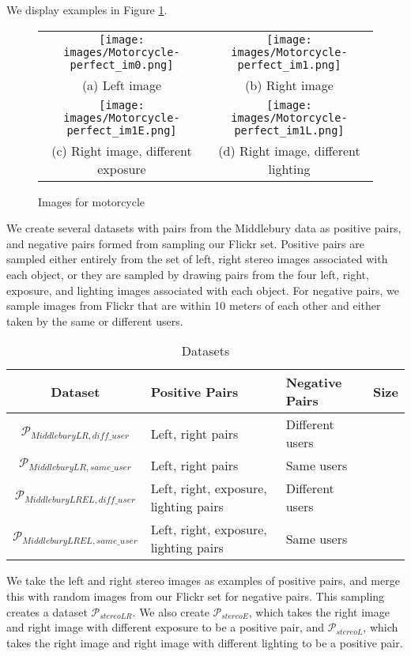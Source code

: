 We display examples in Figure \ref{fig:middlebury}.

\begin{figure}[!htbp]
	\centering
	\begin{tabular}{cc}
		\texttt{[image: images/Motorcycle-perfect\_im0.png]}  &       \texttt{[image: images/Motorcycle-perfect\_im1.png]}  \\
		(a) Left image & (b) Right image\\[6pt]
		\texttt{[image: images/Motorcycle-perfect\_im1E.png]}  &       \texttt{[image: images/Motorcycle-perfect\_im1L.png]} \\
		(c) Right image, different exposure & (d) Right image, different lighting\\[6pt]
	\end{tabular}
	\label{fig:middlebury}
	\caption{Images for motorcycle}
\end{figure}

We create several datasets with pairs from the Middlebury data as positive pairs, and negative pairs formed from sampling our Flickr set. Positive pairs are sampled either entirely from the set of left, right stereo images associated with each object, or they are sampled by drawing pairs from the four left, right, exposure, and lighting images associated with each object. For negative pairs, we sample images from Flickr that are within 10 meters of each other and either taken by the same or different users.

\begin{table}
	\centering
	\begin{tabular}{c >{\centering\arraybackslash}m{3.2cm} >{\centering\arraybackslash}m{3cm} c}
		\toprule
		\bfseries{Dataset} &  \bfseries Positive Pairs & \bfseries Negative Pairs & \bfseries{Size}\\
		\midrule
		$\mathcal{P}_{MiddleburyLR,diff\_user}$ & Left, right pairs & Different users  & \\
		$\mathcal{P}_{MiddleburyLR,same\_user}$ & Left, right pairs& Same users  & \\
		$\mathcal{P}_{MiddleburyLREL,diff\_user}$ & Left, right, exposure, lighting pairs  & Different users  & \\
		$\mathcal{P}_{MiddleburyLREL,same\_user}$ & Left, right, exposure, lighting pairs  & Same users  & \\
	\end{tabular}
	\caption{Datasets}
	\label{table:datasets}
\end{table}
We take the left and right stereo images as examples of positive pairs, and merge this with random images from our Flickr set for negative pairs. This sampling creates a dataset $\mathcal{P}_{stereoLR}$. We also create $\mathcal{P}_{stereoE}$, which takes the right image and right image with different exposure to be a positive pair, and $\mathcal{P}_{stereoL}$, which takes the right image and right image with different lighting to be a positive pair.



